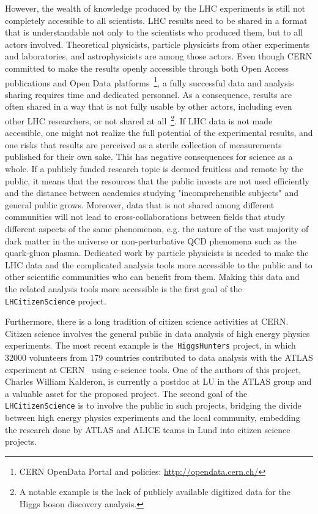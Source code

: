 \documentclass[a4paper,justified]{tufte-handout}
\begin{document}
However, the wealth of knowledge produced by the LHC experiments is still not
completely accessible to all scientists. LHC results need to be shared in a
format that is understandable not only to the scientists who produced them, but to all actors involved. Theoretical physicists, particle
physicists from other experiments and laboratories, and astrophysicists are among those
actors. Even though CERN committed to make the results openly accessible
through both Open Access publications and Open Data platforms~\footnote{CERN
  OpenData Portal and policies: \url{http://opendata.cern.ch/}}, a fully
successful data and analysis sharing requires time and dedicated personnel. As
a consequence, results are often shared in a way that is not fully usable by
other actors, including even other LHC researchers, or not shared at
all~\footnote{A notable example is the lack of publicly available digitized
  data for the Higgs boson discovery analysis.}.
If LHC data is not made accessible, one might not realize the full
potential of the experimental results, and one risks that results are
perceived as a sterile collection of measurements published for their own sake.
This has negative consequences for science as a whole. If a publicly funded
research topic is deemed fruitless and remote by the public, it means that the resources
that the public invests are not used efficiently and the distance between
academics studying "incomprehensible subjects" and general public 
grows. Moreover, data that is not shared among different communities will not
lead to cross-collaborations between fields that study different aspects of
the same phenomenon, e.g. the nature of the vast majority of dark matter in
the universe or non-perturbative QCD phenomena such as the quark-gluon
plasma. Dedicated work by particle physicists is needed to make
the LHC data and the complicated analysis tools more accessible to the public
and to other scientific communities who can benefit from them. Making this data and the related analysis tools more accessible is the first goal of the \texttt{LHCitizenScience} project. 

Furthermore, there is a long tradition of citizen science activities at CERN. Citizen science involves the general public in data analysis of high energy physics experiments. The most recent example is the~\texttt{HiggsHunters} project, in which 32000 volunteers from 179 countries contributed to data analysis with the ATLAS experiment at CERN~\cite{Barr:2016vce} using e-science tools. One of the authors of this project, Charles William Kalderon, is currently a postdoc at LU in the ATLAS group and a valuable asset for the proposed project. The second goal of the \texttt{LHCitizenScience} is to involve the public in such projects, bridging the divide between high energy physics experiments and the local community, embedding the research done by ATLAS and ALICE teams in Lund into citizen science projects. 
\end{document}
